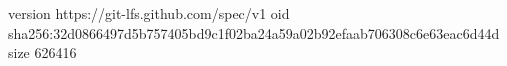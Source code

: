version https://git-lfs.github.com/spec/v1
oid sha256:32d0866497d5b757405bd9c1f02ba24a59a02b92efaab706308c6e63eac6d44d
size 626416
